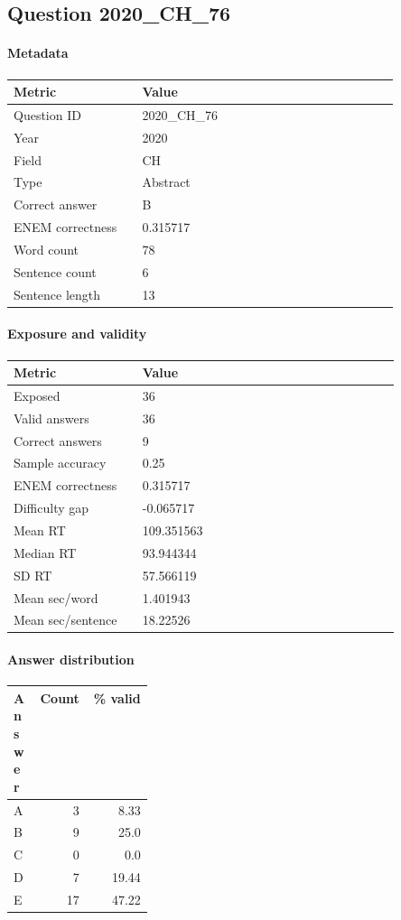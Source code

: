 \subsection*{Question 2020\_CH\_76}
\label{sec:q_2020_CH_76}
\paragraph{Metadata}
\begin{tabular}{p{0.30\linewidth}p{0.60\linewidth}}
\toprule
Metric & Value\\
\midrule
Question ID & 2020\_CH\_76\\
Year & 2020\\
Field & CH\\
Type & Abstract\\
Correct answer & B\\
ENEM correctness & 0.315717\\
Word count & 78\\
Sentence count & 6\\
Sentence length & 13\\
\bottomrule
\end{tabular}

\paragraph{Exposure and validity}
\begin{tabular}{p{0.30\linewidth}p{0.60\linewidth}}
\toprule
Metric & Value\\
\midrule
Exposed & 36\\
Valid answers & 36\\
Correct answers & 9\\
Sample accuracy & 0.25\\
ENEM correctness & 0.315717\\
Difficulty gap & -0.065717\\
Mean RT & 109.351563\\
Median RT & 93.944344\\
SD RT & 57.566119\\
Mean sec/word & 1.401943\\
Mean sec/sentence & 18.22526\\
\bottomrule
\end{tabular}

\paragraph{Answer distribution}
\begin{tabular}{p{0.18\linewidth}rr}
\toprule
Answer & Count & \% valid\\
\midrule
A & 3 & 8.33\\
B & 9 & 25.0\\
C & 0 & 0.0\\
D & 7 & 19.44\\
E & 17 & 47.22\\
\bottomrule
\end{tabular}

